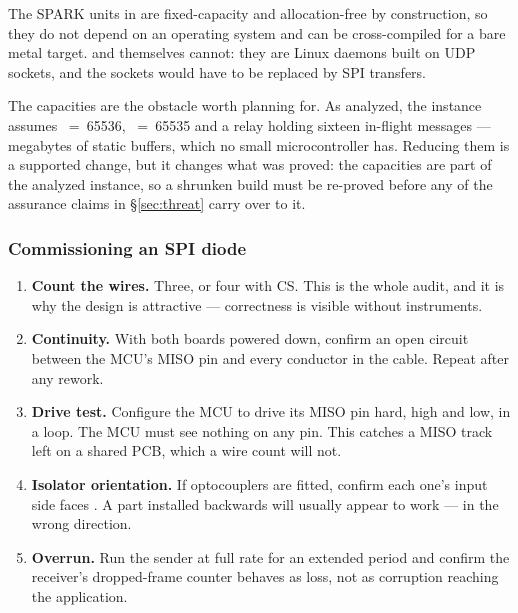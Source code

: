 \documentclass[11pt,a4paper]{article}
\renewcommand{\amp}{\prog{od\_sender}}
\renewcommand{\deamp}{\prog{od\_receiver}}
\begin{document}
\begin{notebox}
The SPARK units in  are fixed-capacity and allocation-free by construction, so
they do not depend on an operating system and can be cross-compiled for a bare
metal target. \amp{} and \deamp{} themselves cannot: they are Linux daemons
built on UDP sockets, and the sockets would have to be replaced by SPI
transfers.

The capacities are the obstacle worth planning for. As analyzed, the instance
assumes ~=~65536, ~=~65535 and a
relay holding sixteen in-flight messages --- megabytes of static buffers, which
no small microcontroller has. Reducing them is a supported change, but it
changes what was proved: the capacities are part of the analyzed instance, so
a shrunken build must be re-proved before any of the assurance claims in
\S\ref{sec:threat} carry over to it.
\end{notebox}

\subsubsection{Commissioning an SPI diode}

\begin{enumerate}
\item \textbf{Count the wires.} Three, or four with CS. This is the whole
      audit, and it is why the design is attractive --- correctness is visible
      without instruments.
\item \textbf{Continuity.} With both boards powered down, confirm an open
      circuit between the \dstside{} MCU's MISO pin and every conductor in
      the cable. Repeat after any rework.
\item \textbf{Drive test.} Configure the \dstside{} MCU to drive its MISO pin
      hard, high and low, in a loop. The \srcside{} MCU must see nothing on
      any pin. This catches a MISO track left on a shared PCB, which a wire
      count will not.
\item \textbf{Isolator orientation.} If optocouplers are fitted, confirm each
      one's input side faces \srcside{}. A part installed backwards will
      usually appear to work --- in the wrong direction.
\item \textbf{Overrun.} Run the sender at full rate for an extended period and
      confirm the receiver's dropped-frame counter behaves as loss, not as
      corruption reaching the application.
\end{enumerate}
\end{document}
